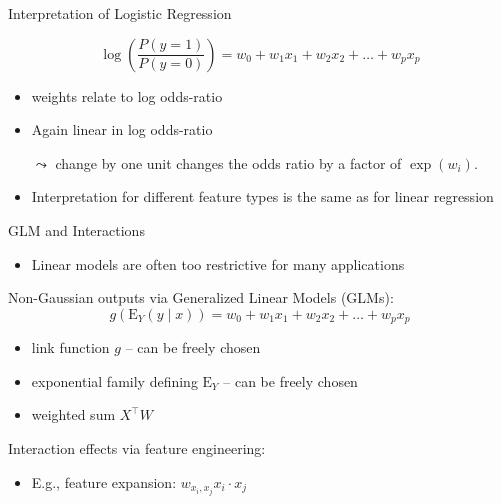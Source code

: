 \documentclass[aspectratio=169]{../latex_main/tntbeamer}  %
\begin{document}

\begin{frame}[c]{Interpretation of Logistic Regression}

    $$\log \left(\frac{P(y = 1)}{P(y=0)}\right) = w_0 + w_1 x_1 + w_2 x_2 + \ldots + w_p x_p  $$

    \begin{itemize}
        \item weights relate to log odds-ratio
        \item Again linear in log odds-ratio
        \item[$\leadsto$] change by one unit changes the odds ratio by a \alert{factor} of $\exp(w_i)$.
        \medskip
        \pause
        \item Interpretation for different feature types is the same as for linear regression
    \end{itemize}	

\end{frame}


\begin{frame}{GLM and Interactions}

    \begin{itemize}
        \item Linear models are often too restrictive for many applications
    \end{itemize}
    
    \medskip
    Non-Gaussian outputs via Generalized Linear Models (GLMs):
    $$g(\mathrm{E}_Y (y\mid x)) = w_0 + w_1 x_1 + w_2 x_2 + \ldots + w_p x_p$$
    \begin{itemize}
        \item link function $g$ -- can be freely chosen
        \item exponential family defining $\mathrm{E}_Y$ -- can be freely chosen
        \item weighted sum $X^\top W$
    \end{itemize}
    
    \medskip 
    \pause
    Interaction effects via feature engineering:
    \begin{itemize}
        \item E.g., feature expansion: $w_{x_i,x_j} x_i \cdot x_j$
    \end{itemize}
    
\end{frame}
\end{document}
